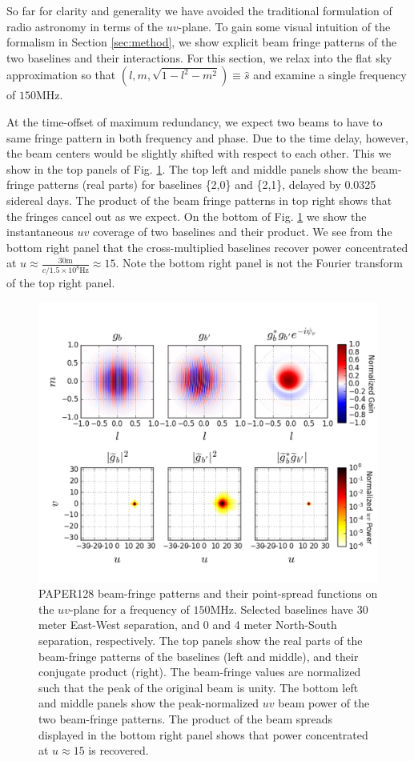 \documentclass[twocolumn,apj,numberedappendix]{emulateapj}
\renewcommand\[{\begin{equation}}
\renewcommand\]{\end{equation}}
\begin{document}
So far for clarity and generality we have avoided the traditional formulation of radio astronomy in terms of the $uv$-plane. To gain some visual intuition of the formalism in Section \ref{sec:method}, we show explicit beam fringe patterns of the two baselines and their interactions. For this section, we relax into the flat sky approximation so that $(l,m,\sqrt{1-l^2-m^2})\equiv\hat{s}$ and examine a single frequency of $150$MHz. 

At the time-offset of maximum redundancy, we expect two beams to have to same fringe pattern in both frequency and phase. Due to the time delay, however, the beam centers would be slightly shifted with respect to each other. This we show in the top panels of Fig. \ref{fig:beamfringe}. The top left and middle panels show the beam-fringe
patterns (real parts) for baselines \{2,0\} and \{2,1\}, delayed by 0.0325 sidereal days.
The product of the beam fringe patterns in top right shows that the fringes
 cancel out as we expect. On the bottom of Fig. \ref{fig:beamfringe} we show the instantaneous $uv$ coverage of two baselines and their product. We see from the bottom right panel that the cross-multiplied baselines recover  power concentrated at $u\approx\frac{30\text{m}}{c/1.5\times10^8\text{Hz}}\approx15$. Note the bottom right panel is not the Fourier transform of the top right panel. 

\begin{figure}[h!]
\includegraphics[width=\textwidth]{BeamFringe}

\caption{PAPER128 beam-fringe patterns and their point-spread functions on the $uv$-plane for a frequency of $150$MHz. Selected baselines have 30 meter East-West separation, and 0 and 4 meter North-South separation, respectively. The top panels show the real parts of the beam-fringe patterns of the baselines (left and middle), and their conjugate product (right). The beam-fringe values are normalized such that the peak of the original beam is unity. 
The bottom left and middle panels show the peak-normalized $uv$ beam power of the two beam-fringe patterns. The product of the beam spreads displayed in the bottom right panel shows that power concentrated at $u\approx15$ is recovered. }
\label{fig:beamfringe}
\end{figure}
\end{document}
